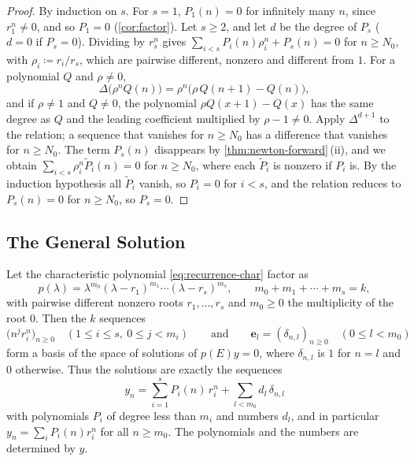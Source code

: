 \begin{proof}
By induction on $s$. For $s=1$, $P_1(n)=0$ for infinitely many $n$, since $r_1^n\ne0$, and so $P_1=0$ (\cref{cor:factor}). Let $s\ge2$, and let $d$ be the degree of $P_s$ ($d=0$ if $P_s=0$). Dividing by $r_s^n$ gives $\sum_{i<s}P_i(n)\rho_i^n+P_s(n)=0$ for $n\ge N_0$, with $\rho_i\coloneqq r_i/r_s$, which are pairwise different, nonzero and different from $1$. For a polynomial $Q$ and $\rho\ne0$,
\[
\Delta\bigl(\rho^nQ(n)\bigr)=\rho^n\bigl(\rho\,Q(n+1)-Q(n)\bigr),
\]
and if $\rho\ne1$ and $Q\ne0$, the polynomial $\rho Q(x+1)-Q(x)$ has the same degree as $Q$ and the leading coefficient multiplied by $\rho-1\ne0$. Apply $\Delta^{d+1}$ to the relation; a sequence that vanishes for $n\ge N_0$ has a difference that vanishes for $n\ge N_0$. The term $P_s(n)$ disappears by \cref{thm:newton-forward}\,(ii), and we obtain $\sum_{i<s}\rho_i^n\tilde P_i(n)=0$ for $n\ge N_0$, where each $\tilde P_i$ is nonzero if $P_i$ is. By the induction hypothesis all $\tilde P_i$ vanish, so $P_i=0$ for $i<s$, and the relation reduces to $P_s(n)=0$ for $n\ge N_0$, so $P_s=0$.
\end{proof}

\subsection{The General Solution}

\begin{theorem}
\label{thm:constant-coefficient-recurrences}
Let the characteristic polynomial \eqref{eq:recurrence-char} factor as
\[
p(\lambda)=\lambda^{m_0}(\lambda-r_1)^{m_1}\cdots(\lambda-r_s)^{m_s},\qquad m_0+m_1+\cdots+m_s=k,
\]
with pairwise different nonzero roots $r_1,\ldots,r_s$ and $m_0\ge0$ the multiplicity of the root $0$. Then the $k$ sequences
\[
\bigl(n^jr_i^n\bigr)_{n\ge0}\quad(1\le i\le s,\ 0\le j<m_i)\qquad\text{and}\qquad\mathbf e_l=(\delta_{n,l})_{n\ge0}\quad(0\le l<m_0)
\]
form a basis of the space of solutions of $p(E)y=0$, where $\delta_{n,l}$ is $1$ for $n=l$ and $0$ otherwise. Thus the solutions are exactly the sequences
\[
y_n=\sum_{i=1}^sP_i(n)\,r_i^n+\sum_{l<m_0}d_l\,\delta_{n,l}
\]
with polynomials $P_i$ of degree less than $m_i$ and numbers $d_l$, and in particular $y_n=\sum_iP_i(n)r_i^n$ for all $n\ge m_0$. The polynomials and the numbers are determined by $y$.
\end{theorem}

